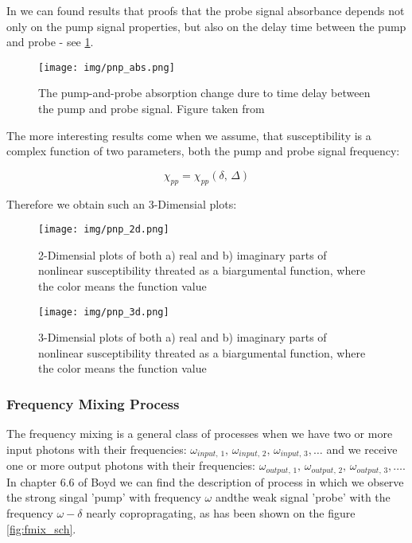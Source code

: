 \documentclass[12pt,twoside,a4paper]{article}
\numberwithin{equation}{subsection}
\numberwithin{figure}{subsection}
\begin{document}
In \cite{christodoulides_nonlinear} we can found results that proofs that the probe signal absorbance depends not only on the pump signal
properties, but also on the delay time between the pump and probe - see \ref{fig:pnp_absorption}.

\begin{figure} 
  \texttt{[image: img/pnp\_abs.png]}
  \caption{The pump-and-probe absorption change dure to time delay between the pump and probe signal.
  Figure taken from \cite{christodoulides_nonlinear} \label{fig:pnp_absorption} }
\end{figure}

The more interesting results come when we assume, that susceptibility is a complex function of two parameters, both the pump and
probe signal frequency:

\begin{equation} \label{eq:pnp_2args}
  \chi_{pp} = \chi_{pp}(\delta , \,\Delta )
\end{equation}

Therefore we obtain such an 3-Dimensial plots:

\begin{figure} \label{fig:pnp_2d}
  \texttt{[image: img/pnp\_2d.png]}
  \caption{2-Dimensial plots of both a) real and b) imaginary parts of nonlinear susceptibility threated as a biargumental
  function, where the color means the function value}
\end{figure}

\begin{figure} \label{fig:pnp_3d}
  \texttt{[image: img/pnp\_3d.png]}
  \caption{3-Dimensial plots of both a) real and b) imaginary parts of nonlinear susceptibility threated as a biargumental
  function, where the color means the function value}
\end{figure}

\subsubsection*{Frequency Mixing Process}

The frequency mixing is a general class of processes when we have two or more input photons with their frequencies:
${\omega_{input, \,1}}, \,{\omega_{input, \,2}}, \,{\omega_{input, \,3}}, \ldots $ and we receive one or more output photons with
their frequencies: ${\omega_{output, \,1}}, \,{\omega_{output,\,2}}, \,{\omega_{output, \,3}}, \ldots $. In chapter 6.6 of Boyd
\cite{boyd_nlo} we can find the description of process in which we observe the strong singal 'pump' with frequency $\omega$ andthe
weak signal 'probe' with the frequency $\omega  - \delta $ nearly copropragating, as has been shown on the figure \ref{fig:fmix_sch}.
\end{document}
